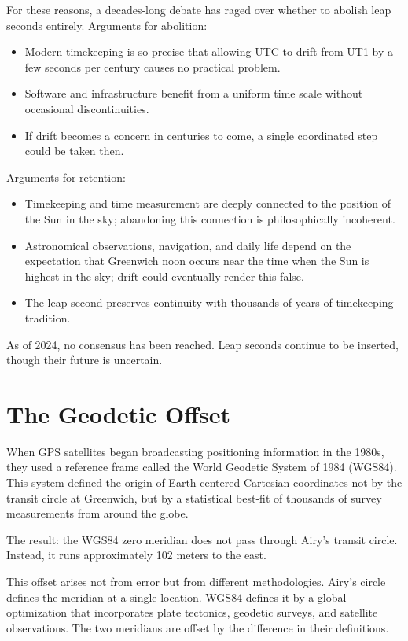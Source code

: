 For these reasons, a decades-long debate has raged over whether to abolish leap seconds entirely. Arguments for abolition:

\begin{itemize}
\item Modern timekeeping is so precise that allowing UTC to drift from UT1 by a few seconds per century causes no practical problem.
\item Software and infrastructure benefit from a uniform time scale without occasional discontinuities.
\item If drift becomes a concern in centuries to come, a single coordinated step could be taken then.
\end{itemize}

Arguments for retention:

\begin{itemize}
\item Timekeeping and time measurement are deeply connected to the position of the Sun in the sky; abandoning this connection is philosophically incoherent.
\item Astronomical observations, navigation, and daily life depend on the expectation that Greenwich noon occurs near the time when the Sun is highest in the sky; drift could eventually render this false.
\item The leap second preserves continuity with thousands of years of timekeeping tradition.
\end{itemize}

As of 2024, no consensus has been reached. Leap seconds continue to be inserted, though their future is uncertain.

\section{The Geodetic Offset}

When GPS satellites began broadcasting positioning information in the 1980s, they used a reference frame called the World Geodetic System of 1984 (WGS84). This system defined the origin of Earth-centered Cartesian coordinates not by the transit circle at Greenwich, but by a statistical best-fit of thousands of survey measurements from around the globe.

The result: the WGS84 zero meridian does not pass through Airy's transit circle. Instead, it runs approximately 102 meters to the east.

This offset arises not from error but from different methodologies. Airy's circle defines the meridian at a single location. WGS84 defines it by a global optimization that incorporates plate tectonics, geodetic surveys, and satellite observations. The two meridians are offset by the difference in their definitions.

